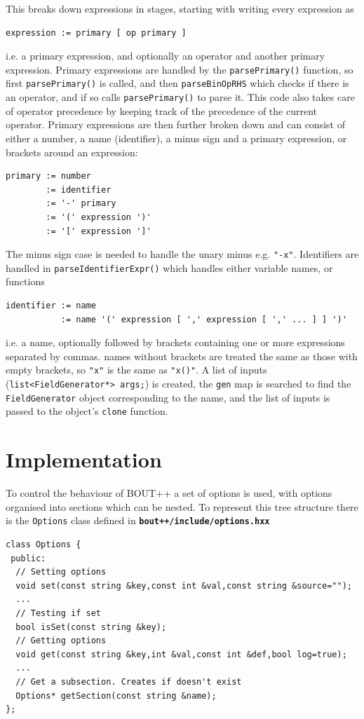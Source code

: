 \documentclass[12pt]{article}
\newcommand{\file}[1]{\texttt{\bf #1}}
\begin{document}
This breaks down expressions in stages, starting with writing every expression as
\begin{verbatim}
expression := primary [ op primary ]
\end{verbatim}
i.e. a primary expression, and optionally an operator and another primary expression. Primary
expressions are handled by the \lstinline!parsePrimary()! function, so first \lstinline!parsePrimary()! is called,
and then \lstinline!parseBinOpRHS! which checks if there is an operator, and if so calls \lstinline!parsePrimary()! to
parse it. This code also takes care of operator precedence by keeping track of the precedence
of the current operator. Primary expressions are then further broken down and can consist of either
a number, a name (identifier), a minus sign and a primary expression, or brackets around an  expression:
\begin{verbatim}
primary := number
        := identifier
        := '-' primary
        := '(' expression ')'
        := '[' expression ']'
\end{verbatim}
The minus sign case is needed to handle the unary minus e.g. \lstinline!"-x"!. Identifiers are handled
in \lstinline!parseIdentifierExpr()! which handles either variable names, or functions
\begin{verbatim}
identifier := name
           := name '(' expression [ ',' expression [ ',' ... ] ] ')'
\end{verbatim}
i.e. a name, optionally followed by brackets containing one or more expressions separated by commas.
names without brackets are treated the same as those with empty brackets, so \lstinline!"x"! is the same
as \lstinline!"x()"!. A list of inputs (\lstinline!list<FieldGenerator*> args;!) is created,
the \lstinline!gen! map is searched to find the \lstinline!FieldGenerator! object corresponding to the name,
and the list of inputs is passed to the object's \lstinline!clone! function.

\section{Implementation}
To control the behaviour of BOUT++ a set of options is used, with
options organised into sections which can be nested. To represent this
tree structure there is the \lstinline!Options! class defined in
\file{bout++/include/options.hxx}
\begin{lstlisting}
class Options {
 public:
  // Setting options
  void set(const string &key,const int &val,const string &source="");
  ...
  // Testing if set
  bool isSet(const string &key);
  // Getting options
  void get(const string &key,int &val,const int &def,bool log=true);
  ...
  // Get a subsection. Creates if doesn't exist
  Options* getSection(const string &name);
};
\end{lstlisting}
\end{document}
